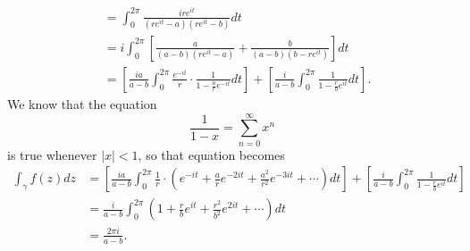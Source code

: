 \documentclass[12pt]{article}
\begin{document}
\begin{itemize}
\begin{align*}
                               &= \int_0^{2\pi} \frac{ire^{it}}{(re^{it}-a)(re^{it}-b)} dt \\
                               &= i \int_0^{2\pi} \left[ \frac{a}{(a-b)(re^{it}-a)} + \frac{b}{(a-b)(b-re^{it})} \right] dt \\
                               &= \left[ \frac{ia}{a-b} \int_0^{2\pi} \frac{e^{-it}}{r} \cdot \frac{1}{1 - \frac{a}{r} e^{-it}} dt \right] + \left[ \frac{i}{a-b} \int_0^{2\pi} \frac{1}{1 - \frac{r}{b} e^{it}} dt \right] .
        \end{align*}
        We know that the equation
        \[ \frac{1}{1-x} = \sum_{n=0}^\infty x^n \]
        is true whenever $|x|<1$, so that equation becomes
        \begin{align*}
            \int_\gamma f(z) dz &= \left[ \frac{ia}{a-b} \int_0^{2\pi} \frac{1}{r} \cdot \left( e^{-it} + \frac{a}{r} e^{-2it} + \frac{a^2}{r^2} e^{-3it} + \cdots \right) dt \right] + \left[ \frac{i}{a-b} \int_0^{2\pi} \frac{1}{1 - \frac{r}{b} e^{it}} dt \right] \\
                                &= \frac{i}{a-b} \int_0^{2\pi} \left( 1 + \frac{r}{b} e^{it} + \frac{r^2}{b^2} e^{2it} + \cdots \right) dt \\
                                &= \frac{2 \pi i}{a-b}.
        \end{align*}
\end{itemize}
\end{document}
